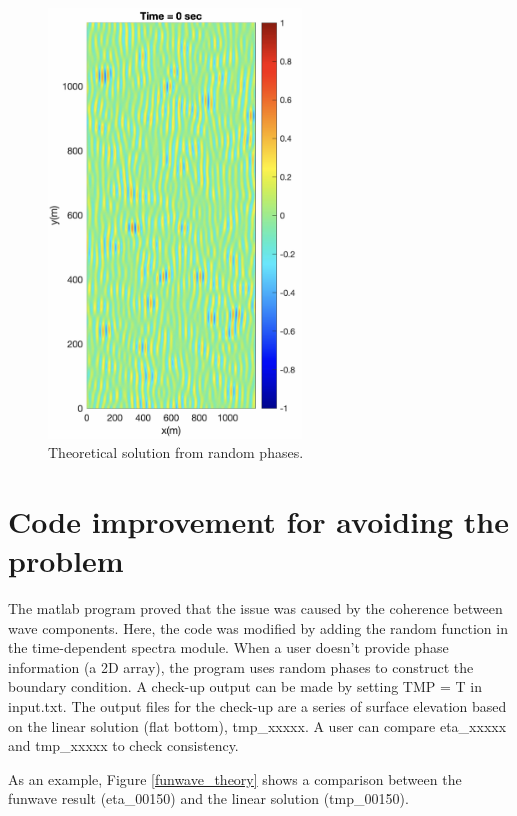 \documentclass[preprint,10pt]{elsarticle}
\begin{document}
  \begin{figure}
\begin{center}
 \includegraphics[width=0.6\textwidth]{figures/rand_phase.png}
 \caption{Theoretical solution from random phases.}
 \label{rand_phase}
 \end{center}
 \end{figure}
 
 \section{Code improvement for avoiding the problem}
 The matlab program proved that the issue was caused by the coherence between wave components. Here, the code was modified by adding the random function in the time-dependent spectra module. When a user doesn't provide phase information (a 2D array), the program uses random phases to construct the boundary condition. A check-up output can be made by setting TMP = T in input.txt. The output files for the check-up are a series of surface elevation based on the linear solution (flat bottom), tmp\_xxxxx. A user can compare eta\_xxxxx and tmp\_xxxxx to check consistency. 
 
 As an example, Figure \ref{funwave_theory} shows a comparison between the funwave result (eta\_00150) and the linear solution (tmp\_00150). 
 
\end{document}
